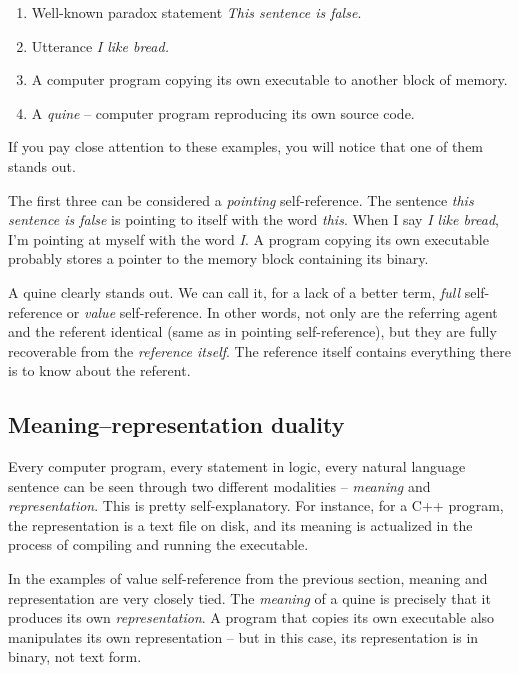 \documentclass{article}
\begin{document}
\begin{enumerate}
    \item Well-known paradox statement \textit{This sentence is false}.
    \item Utterance \textit{I like bread.}
    \item A computer program copying its own executable to another block of memory.
    \item A \textit{quine} -- computer program reproducing its own source code.
\end{enumerate}

If you pay close attention to these examples, you will notice that one of them stands out.

The first three can be considered a \textit{pointing} self-reference. The sentence \textit{this
sentence is false} is pointing to itself with the word \textit{this}. When I say \textit{I
like bread}, I'm pointing at myself with the word \textit{I}. A program copying its own executable
probably stores a pointer to the memory block containing its binary.

A quine clearly stands out. We can call it, for a lack of a better term, \textit{full}
self-reference or \textit{value} self-reference. In other words, not only are the referring
agent and the referent identical (same as in pointing self-reference), but they are fully
recoverable from the \textit{reference itself}. The reference itself contains everything there
is to know about the referent.

\subsection{Meaning--representation duality}

Every computer program, every statement in logic, every natural language sentence
can be seen through two different modalities -- \textit{meaning} and \textit{representation}.
This is pretty self-explanatory. For instance, for a C++ program, the representation is a text
file on disk, and its meaning is actualized in the process of compiling and running the
executable.

In the examples of value self-reference from the previous section, meaning and representation
are very closely tied. The \textit{meaning} of a quine is precisely that it produces its own
\textit{representation}. A program that copies its own executable also manipulates its own
representation -- but in this case, its representation is in binary, not text form.
\end{document}
